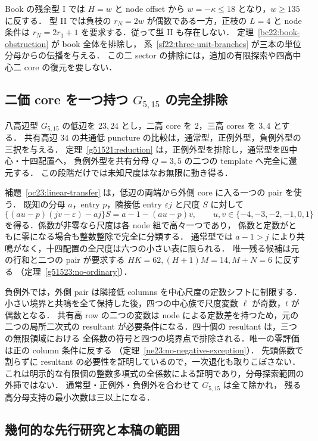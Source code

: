 Book の残余型 I では $H=w$ と node offset から
$w=-\kappa\le18$ となり，$w\ge135$ に反する．
型 II では負枝の $r_N=2w$ が偶数である一方，正枝の $L=4$ と node 条件は
$r_N=2r_1+1$ を要求する．従って型 II も存在しない．
定理~\ref{bc22:book-obstruction} が book 全体を排除し，
系~\ref{sf22:three-unit-branches} が三本の単位分母からの伝播を与える．
この二 sector の排除には，追加の有限探索や四高中心二 core の復元を要しない．

\subsection{二価 core を一つ持つ \texorpdfstring{$G_{5,15}$}{G5,15} の完全排除}

八高辺型 $G_{5,15}$ の低辺を $23,24$ とし，二高 core を $2$，三高 cores を $3,4$ とする．
共有高辺 $34$ の共通低 puncture の比較は，通常型，正例外型，負例外型の三択を与える．
定理~\ref{g51521:reduction} は，正例外型を排除し，通常型を四中心・十四配置へ，
負例外型を共有分母 $Q=3,5$ の二つの template へ完全に還元する．
この段階だけでは未知尺度はなお無限に動き得る．

補題~\ref{oc23:linear-transfer} は，低辺の両端から外側 core に入る一つの pair を使う．
既知の分母 $a$，entry $p$，隣接低 entry $\varepsilon j$ と尺度 $S$ に対して
\[
 \{(au-p)(jv-\varepsilon)-aj\}S=a-1-(au-p)v,
 \qquad u,v\in\{-4,-3,-2,-1,0,1\}
\]
を得る．係数が非零なら尺度は各 node 組で高々一つであり，
係数と定数がともに零になる場合も整数整除で完全に分類する．
通常型では $a-1>j$ により共鳴がなく，十四配置の全尺度は六つの小さい表に限られる．
唯一残る候補は元の行和と二つの pair が要求する
$HK=62,(H+1)M=14,M+N=6$ に反する
（定理~\ref{g51523:no-ordinary}）．

負例外では，外側 pair は隣接低 columns を中心尺度の定数シフトに制限する．
小さい境界と共鳴を全て保持した後，四つの中心族で尺度変数 $\ell$ が奇数，$t$ が偶数となる．
共有高 row の二つの変数は node による定数差を持つため，元の二つの局所二次式の
resultant が必要条件になる．四十個の resultant は，三つの無限領域における
全係数の符号と四つの境界点で排除される．唯一の零評価は正の column 条件に反する
（定理~\ref{ne23:no-negative-exception}）．
先頭係数で割らずに resultant の必要性を証明しているので，一次退化も取りこぼさない．
これは明示的な有限個の整数多項式の全係数による証明であり，分母探索範囲の外挿ではない．
通常型・正例外・負例外を合わせて $G_{5,15}$ は全て除かれ，
残る高分母支持の最小次数は三以上になる．

\subsection{幾何的な先行研究と本稿の範囲}

